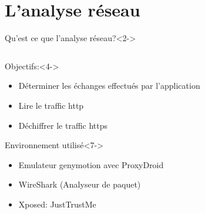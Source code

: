\documentclass[aspectratio=1610, ]{beamer}%
\begin{document}
 
\section{L'analyse réseau}
\begin{frame}[t]
  \slidetitle[]
  \begin{block}{Qu'est ce que l'analyse réseau?}<2->
    \end{block}
  \begin{columns}
    \begin{column}{0.7\linewidth}
      \begin{block}{Objectifs:}<4->
        \begin{itemize}
        \item<5-> Déterminer les échanges effectués par l'application
        \item<6-> Lire le traffic http
        \item<7-> Déchiffrer le traffic https
        \end{itemize}
      \end{block}
      \begin{block}{Environnement utilisé}<7->
        \begin{itemize}
          \item<8-> Emulateur genymotion avec ProxyDroid
          \item<9-> WireShark (Analyseur de paquet)
          \item<10-> Xposed: JustTrustMe
          \end{itemize}
      \end{block}    
    \end{column}
    \begin{column}{0.25\linewidth}
      \centering

\end{column}
\end{columns}
\end{frame}
\end{document}
